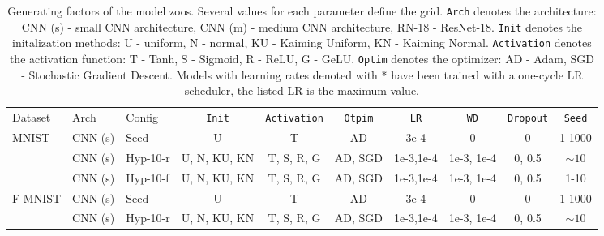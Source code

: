 %
\begin{table}[]
\begin{tabular}{lllllllll}
\cline{1-8}
\end{tabular}
\end{table}

\begin{table}[]
{
\scriptsize
\caption{Generating factors of the model zoos. Several values for each parameter define the grid.
\texttt{Arch} denotes the architecture: CNN (s) - small CNN architecture, CNN (m) - medium CNN architecture, RN-18 - ResNet-18.
\texttt{Init} denotes the initalization methods: U - uniform, N - normal, KU - Kaiming Uniform, KN - Kaiming Normal.
\texttt{Activation} denotes the activation function: T - Tanh, S - Sigmoid, R - ReLU, G - GeLU.
\texttt{Optim} denotes the optimizer: AD - Adam, SGD - Stochastic Gradient Descent.
Models with learning rates denoted with * have been trained with a one-cycle LR scheduler, the listed LR is the maximum value.
}
\label{tab:generating_factors}
{
\centering
\begin{tabular}{@{}lllccccccc@{}}
\toprule
Dataset                        & Arch & Config & \texttt{Init}           & \texttt{Activation}     & \texttt{Otpim}     & \texttt{LR}        & \texttt{WD}              & \texttt{Dropout}       & \texttt{Seed}   \\
\cmidrule(r){1-1} \cmidrule(rl){2-2}  \cmidrule(rl){3-3} \cmidrule(rl){4-4} \cmidrule(rl){5-5}  \cmidrule(rl){6-6}  \cmidrule(rl){7-7}  \cmidrule(rl){8-8}  \cmidrule(rl){9-9} \cmidrule(rl){10-10} 
\multirow{3}{*}{MNIST}         & CNN (s) & Seed          & U              & T              & AD          & 3e-4      & 0             & 0           & 1-1000 \\
                               & CNN (s) & Hyp-10-r   & U, N, KU, KN & T, S, R, G     & AD, SGD     & 1e-3,1e-4 & 1e-3, 1e-4      & 0, 0.5      & $\sim 10$     \\
                               & CNN (s) & Hyp-10-f    & U, N, KU, KN & T, S, R, G     & AD, SGD     & 1e-3,1e-4 & 1e-3, 1e-4      & 0, 0.5      & 1-10   \\
\cmidrule(r){1-1} \cmidrule(rl){2-2}  \cmidrule(rl){3-3} \cmidrule(rl){4-4} \cmidrule(rl){5-5}  \cmidrule(rl){6-6}  \cmidrule(rl){7-7}  \cmidrule(rl){8-8}  \cmidrule(rl){9-9} \cmidrule(rl){10-10} 
\multirow{3}{*}{F-MNIST}       & CNN (s) & Seed          & U              & T              & AD          & 3e-4      & 0             & 0           & 1-1000 \\
                               & CNN (s) & Hyp-10-r   & U, N, KU, KN & T, S, R, G     & AD, SGD     & 1e-3,1e-4 & 1e-3, 1e-4      & 0, 0.5      & $\sim 10$        \\

\end{tabular}}}
\end{table}

